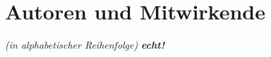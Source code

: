 \documentclass[ngerman,a4paper,fontsize=9pt,BCOR=1.5cm,headings=big,draft=no]{scrbook}
\newcommand{\strongemph}[1]{\emph{\textbf{#1}}}
\newcommand\gT[1]{\textbf{\textup{\textcolor[rgb]{0.0,0.5019608,0.0}{#1}}}}
\begin{document}

\setcounter{tocdepth}{3}
\dominitoc
\tableofcontents

\listoffigures
%

\section*{Autoren und Mitwirkende}

\emph{(in alphabetischer Reihenfolge)}
\strongemph{echt!}
\end{document}
